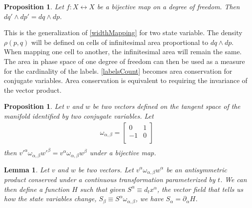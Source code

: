 \documentclass[twocolumn,floatfix,nofootinbib]{revtex4}   %
\theoremstyle{theorem}
\newtheorem{lem}[thm]{Lemma}
\newtheorem{prop}[thm]{Proposition}
\theoremstyle{definition}
\begin{document}
\begin{prop}\label{sdofMap}
Let $f: X \leftrightarrow X$ be a bijective map on a degree of freedom. Then $dq' \wedge dp' = dq \wedge dp$.
\end{prop}

This is the generalization of \ref{widthMapping} for two state variable. The density $\rho(p,q)$ will be defined on cells of infinitesimal area proportional to $dq \wedge dp$. When mapping one cell to another, the infinitesimal area will remain the same. The area in phase space of one degree of freedom can then be used as a measure for the cardinality of the labels. \ref{labelsCount} becomes area conservation for conjugate variables. Area conservation is equivalent to requiring the invariance of the vector product.

\begin{prop}\label{sdofInvariance}
Let $v$ and $w$ be two vectors defined on the tangent space of the manifold identified by two conjugate variables. Let
\begin{align*}
\omega_{\alpha, \beta} = \left[
  \begin{array}{cc}
    0 & 1 \\
    -1 & 0 \\
  \end{array}
\right] \\
\end{align*}
then $v'^{\alpha} \omega_{\alpha, \beta} w'^{\beta}=v^{\alpha} \omega_{\alpha, \beta} w^{\beta}$ under a bijective map.
\end{prop}

\begin{lem}\label{genAntisim}
Let $v$ and $w$ be two vectors. Let $v^{\alpha} \omega_{\alpha, \beta} w^{\alpha}$ be an antisymmetric product conserved under a continuous transformation parameterized by $t$. We can then define a function $H$ such that given $S^{\alpha} \equiv d_{t}x^{\alpha}$, the vector field that tells us how the state variables change, $S_{\beta} \equiv S^{\alpha} \omega_{\alpha, \beta}$, we have $S_{\alpha} = \partial_{\alpha}H$.
\end{lem}
\end{document}
